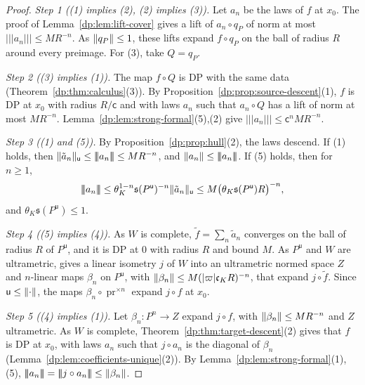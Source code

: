 \begin{proof}
\emph{Step 1 ((1) implies (2), (2) implies (3)).} Let $a_n$ be the laws of $f$ at $x_0$. The proof of Lemma~\ref{dp:lem:lift-cover} gives a lift of $a_n\circ q_P$ of norm at most $\lvert\!\lvert\!\lvert a_n\rvert\!\rvert\!\rvert\le MR^{-n}$. As $\lVert q_P\rVert\le1$, these lifts expand $f\circ q_P$ on the ball of radius $R$ around every preimage. For (3), take $Q=q_P$.

\emph{Step 2 ((3) implies (1)).} The map $f\circ Q$ is DP with the same data (Theorem~\ref{dp:thm:calculus}(3)). By Proposition~\ref{dp:prop:source-descent}(1), $f$ is DP at $x_0$ with radius $R/\mathsf c$ and with laws $a_n$ such that $a_n\circ Q$ has a lift of norm at most $MR^{-n}$. Lemma~\ref{dp:lem:strong-formal}(5),(2) give $\lvert\!\lvert\!\lvert a_n\rvert\!\rvert\!\rvert\le\mathsf c^nMR^{-n}$.

\emph{Step 3 ((1) and (5)).} By Proposition~\ref{dp:prop:hull}(2), the laws descend. If (1) holds, then $\lVert \tilde a_n\rVert_{\mathsf u}\le\lvert\!\lvert\!\lvert a_n\rvert\!\rvert\!\rvert\le MR^{-n}$, and $\lVert a_n\rVert\le\lvert\!\lvert\!\lvert a_n\rvert\!\rvert\!\rvert$. If (5) holds, then for $n\ge1$,
\[
 \lvert\!\lvert\!\lvert a_n\rvert\!\rvert\!\rvert\le\theta_K^{1-n}\mathfrak s(P^{\mathsf u})^{-n}\lVert \tilde a_n\rVert_{\mathsf u}\le M\bigl(\theta_K\mathfrak s(P^{\mathsf u})R\bigr)^{-n},
\]
and $\theta_K\mathfrak s(P^{\mathsf u})\le1$.

\emph{Step 4 ((5) implies (4)).} As $W$ is complete, $\tilde f=\sum_n\tilde a_n$ converges on the ball of radius $R$ of $P^{\mathsf u}$, and it is DP at $0$ with radius $R$ and bound $M$. As $P^{\mathsf u}$ and $W$ are ultrametric, \cite[Theorem~14.39(1)]{I} gives a linear isometry $j$ of $W$ into an ultrametric normed space $Z$ and $n$\nobreakdash-linear maps $\beta_n$ on $P^{\mathsf u}$, with $\lVert \beta_n\rVert\le M(\lvert \varpi\rvert\mathfrak c_KR)^{-n}$, that expand $j\circ\tilde f$. Since $\mathsf u\le\lVert \cdot\rVert$, the maps $\beta_n\circ\operatorname{pr}^{\times n}$ expand $j\circ f$ at $x_0$.

\emph{Step 5 ((4) implies (1)).} Let $\beta_n\colon P^n\to Z$ expand $j\circ f$, with $\lVert \beta_n\rVert\le MR^{-n}$ and $Z$ ultrametric. As $W$ is complete, Theorem~\ref{dp:thm:target-descent}(2) gives that $f$ is DP at $x_0$, with laws $a_n$ such that $j\circ a_n$ is the diagonal of $\beta_n$ (Lemma~\ref{dp:lem:coefficients-unique}(2)). By Lemma~\ref{dp:lem:strong-formal}(1),(5), $\lvert\!\lvert\!\lvert a_n\rvert\!\rvert\!\rvert=\lvert\!\lvert\!\lvert j\circ a_n\rvert\!\rvert\!\rvert\le\norm{\beta_n}$.
\end{proof}

